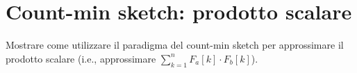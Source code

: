 \chapter{Count-min sketch: prodotto scalare}

\begin{problem*}
    Mostrare come utilizzare il paradigma del count-min sketch per approssimare il
    prodotto scalare (i.e., approssimare \(\sum_{k=1}^n{F_a[k]\cdot F_b[k]}\)).
\end{problem*}

